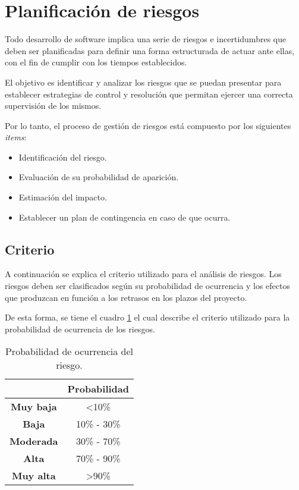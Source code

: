 \section{Planificación de riesgos}
Todo desarrollo de software implica una serie de riesgos e incertidumbres que deben ser planificadas para definir una forma estructurada de actuar ante ellas, con el fin de cumplir con los tiempos establecidos.

El objetivo es identificar y analizar los riesgos que se puedan presentar para establecer estrategias de control y resolución que permitan ejercer una correcta supervisión de los mismos.

Por lo tanto, el proceso de gestión de riesgos está compuesto por los siguientes \textit{items}:

\begin{itemize}
	\item Identificación del riesgo.
  \item Evaluación de su probabilidad de aparición.
  \item Estimación del impacto.
  \item Establecer un plan de contingencia en caso de que ocurra.
\end{itemize}

\subsection{Criterio}
A continuación se explica el criterio utilizado para el análisis de riesgos. Los riesgos deben ser clasificados según su probabilidad de ocurrencia y los efectos que produzcan en función a los retrasos en los plazos del proyecto. 

De esta forma, se tiene el cuadro \ref{tab:probabilidad_riesgo} el cual describe el criterio utilizado para la probabilidad de ocurrencia de los riesgos.

\begin{table}[H]
  \centering
  \begin{tabular}{|c|c|}
  \hline
                    & \textbf{Probabilidad} \\ \hline
  \textbf{Muy baja} & \textless 10\%        \\ \hline
  \textbf{Baja}     & 10\% - 30\%           \\ \hline
  \textbf{Moderada} & 30\% - 70\%           \\ \hline
  \textbf{Alta}     & 70\% - 90\%           \\ \hline
  \textbf{Muy alta} & \textgreater 90\%     \\ \hline
  \end{tabular}
  \caption{Probabilidad de ocurrencia del riesgo.}
  \label{tab:probabilidad_riesgo}
  \end{table}

